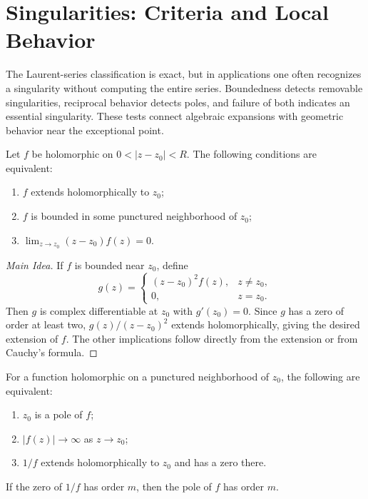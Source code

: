 \section{Singularities: Criteria and Local Behavior}

The Laurent-series classification is exact, but in applications one often recognizes a singularity without computing the entire series. Boundedness detects removable singularities, reciprocal behavior detects poles, and failure of both indicates an essential singularity. These tests connect algebraic expansions with geometric behavior near the exceptional point.

\begin{theorem}
Let $f$ be holomorphic on $0<|z-z_0|<R$. The following conditions are equivalent:
\begin{enumerate}
    \item $f$ extends holomorphically to $z_0$;
    \item $f$ is bounded in some punctured neighborhood of $z_0$;
    \item $\displaystyle \lim_{z\to z_0}(z-z_0)f(z)=0$.
\end{enumerate}
\end{theorem}

\begin{proof}[Main Idea]
If $f$ is bounded near $z_0$, define
\[
    g(z)=
    \begin{cases}
    (z-z_0)^2f(z),&z\neq z_0,\\
    0,&z=z_0.
    \end{cases}
\]
Then $g$ is complex differentiable at $z_0$ with $g'(z_0)=0$. Since $g$ has a zero of order at least two, $g(z)/(z-z_0)^2$ extends holomorphically, giving the desired extension of $f$. The other implications follow directly from the extension or from Cauchy's formula.
\end{proof}

\begin{theorem}
For a function holomorphic on a punctured neighborhood of $z_0$, the following are equivalent:
\begin{enumerate}
    \item $z_0$ is a pole of $f$;
    \item $|f(z)|\to\infty$ as $z\to z_0$;
    \item $1/f$ extends holomorphically to $z_0$ and has a zero there.
\end{enumerate}
If the zero of $1/f$ has order $m$, then the pole of $f$ has order $m$.
\end{theorem}

